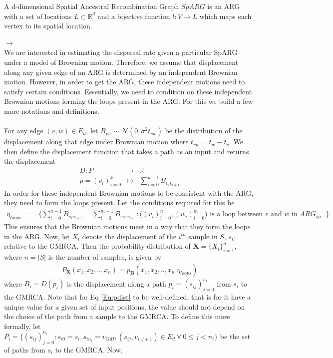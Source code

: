 \begin{definition}[SpARG] A d-dimensional Spatial Ancestral Recombination Graph $SpARG$ is an ARG with a set of locations $L \subset \mathbb{R}^d $ and a bijective function $l:V \rightarrow L$ which maps each vertex to its spatial location. 
\end{definition}
$\rightarrow$ \\
We are interested in estimating the dispersal rate given a particular SpARG under a model of Brownian motion. Therefore, we assume that displacement along any given edge of an ARG is determined by an independent Brownian motion. However, in order to get the ARG, these independent motions need to satisfy certain conditions. Essentially, we need to condition on these independent Brownian motions forming the loops present in the ARG. For this we build a few more notations and definitions. \\ \\ 
For any edge $(v,w) \in E_d$, let $B_{vw} \sim \mathcal{N}( 0, \sigma^2 t_{vw})$ be the distribution of the displacement along that edge under Brownian motion where $t_{vw} = t_w - t_v$. We then define the displacement function that takes a path as an input and returns the displacement
\begin{eqnarray*}
D : P &\rightarrow& \mathbb{R} \\
p = (v_i)_{i=0}^{k} &\mapsto& \sum_{i=0}^{k-1} B_{v_iv_{i+1}}
\end{eqnarray*}
In order for these independent Brownian motions to be consistent with the ARG, they need to form the loops present. Let the conditions required for this be
\begin{eqnarray*}
    \eta_{loops} &=& \{ \displaystyle \sum_{i=0}^{n-1} B_{v_i v_{i+1} } = \sum_{i=0}^{m-1} B_{w_i w_{i+1} } : \big( (v_i)_{i=0}^{n}, (w_i)_{i=0}^{m} \big) \text{ is a loop between $v$ and $w$ in $ARG_{sp}$ }    \}
\end{eqnarray*}
This ensures that the Brownian motions meet in a way that they form the loops in the ARG. 
Now, let $X_i$ denote the displacement of the $i^{th}$ sample in $S$, $s_i$, relative to the GMRCA. Then the probability distribution of $\mathbf{X} = \{ X_i \}_{i=1}^{n}$, where $n = |S|$ is the number of samples, is given by 
\begin{eqnarray}
    \label{Eq:pdist}
    P_\mathbf{X}(x_1,x_2,..,x_n) = p_\mathbf{B}(x_1,x_2,..,x_n | \eta_{loops})
\end{eqnarray}
 where $B_i = \displaystyle D(p_i)$ is the displacement along a path $p_i = ( s_{ij})_{j=0}^{n_i}$ from $s_i$ to the GMRCA. Note that for Eq \ref{Eq:pdist} to be well-defined, that is for it have a unique value for a given set of input positions, the value should not depend on the choice of the path from a sample to the GMRCA. To define this more formally, let $P_i = \{ (s_{ij} )_{j=0}^{n_i} : s_{i0} = s_i, s_{in_i} = v_{GM}, (s_{ij},v_{i,j+1}) \in E_d \ \forall \ 0\leq j < n_i  \}$ be the set of paths from $s_i$ to the GMRCA. Now, 
